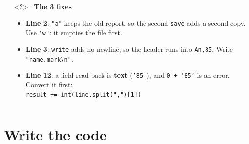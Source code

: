 \documentclass[aspectratio=169]{beamer}
\newcommand{\code}[1]{\texttt{#1}}
\newcommand{\goodlabel}[1]{\textcolor{goodgreen}{\ding{51}~\textbf{#1}}}
\begin{document}
\begin{frame}
\begin{columns}[T,onlytextwidth]
\begin{onlyenv}
    \end{onlyenv}
    \begin{onlyenv}<2>
    \goodlabel{The 3 fixes}
    \begin{itemize}[itemsep=0.25em, leftmargin=1em]
      \footnotesize
      \item \textbf{Line 2}: \code{"a"} keeps the old report, so the second
            \code{save} adds a second copy. Use \code{"w"}: it empties the file
            first.
      \item \textbf{Line 3}: \code{write} adds no newline, so the header runs into
            \code{An,85}. Write \code{"name,mark\textbackslash n"}.
      \item \textbf{Line 12}: a field read back is \textbf{text} (\code{'85'}), and
            \code{0 + '85'} is an error. Convert it first:\\
            \code{result += int(line.split(",")[1])}
    \end{itemize}
    \end{onlyenv}
  \end{columns}
\end{frame}

\section{Write the code}
\end{document}
